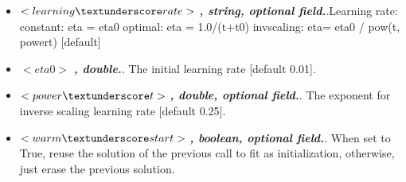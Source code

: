 \begin{itemize}
  \item $<learning\textunderscore rate>$ \textbf{\textit{, string, optional field.}}.Learning rate: constant: eta = eta0 optimal: eta = 1.0/(t+t0) invscaling: eta= eta0 / pow(t, power\textunderscore t) [default]
  \item $<eta0>$ \textbf{\textit{, double.}}. The initial learning rate [default 0.01].
  \item $<power\textunderscore t>$ \textbf{\textit{, double, optional field.}}. The exponent for inverse scaling learning rate [default 0.25].
  \item $<warm\textunderscore start>$ \textbf{\textit{, boolean, optional field.}}. When set to True, reuse the solution of the previous call to fit as initialization, otherwise, just erase the previous solution.
\end{itemize}

